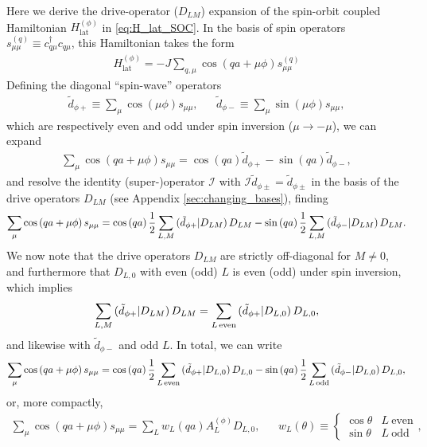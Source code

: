 \documentclass[nofootinbib,notitlepage,11pt]{revtex4-2}
\renewcommand{\t}{\text} %
\newcommand{\f}[2]{\dfrac{#1}{#2}} %
\newcommand{\p}[1]{\left(#1\right)} %
\newcommand{\1}{\mathds{1}}
\newcommand{\I}{\mathcal{I}}
\def\obk#1{\mathinner{({#1})}}
\begin{document}
Here we derive the drive-operator ($D_{LM}$) expansion of the
spin-orbit coupled Hamiltonian $H_{\t{lat}}^{(\phi)}$ in
\eqref{eq:H_lat_SOC}.  In the basis of spin operators
$s_{\mu\mu}^{(q)} \equiv c_{q\mu}^\dag c_{q\mu}$, this Hamiltonian
takes the form
\begin{align}
  H_{\t{lat}}^{(\phi)}
  = -J \sum_{q,\mu} \cos\p{qa+\mu\phi} s_{\mu\mu}^{(q)}
  \label{eq:H_lat_spin}
\end{align}
Defining the diagonal ``spin-wave'' operators
\begin{align}
  \tilde d_{\phi+} \equiv \sum_\mu \cos\p{\mu\phi} s_{\mu\mu},
  &&
  \tilde d_{\phi-} \equiv \sum_\mu \sin\p{\mu\phi} s_{\mu\mu},
\end{align}
which are respectively even and odd under spin inversion
($\mu\to-\mu$), we can expand
\begin{align}
  \sum_\mu \cos\p{qa+\mu\phi} s_{\mu\mu}
  = \cos\p{qa} \tilde d_{\phi+} - \sin\p{qa} \tilde d_{\phi-},
\end{align}
and resolve the identity (super-)operator $\I$ with
$\I \tilde d_{\phi\pm} = \tilde d_{\phi\pm}$ in the basis of the drive operators
$D_{LM}$ (see Appendix \ref{sec:changing_bases}), finding
\begin{align}
  \sum_\mu \cos\p{qa+\mu\phi} s_{\mu\mu}
  = \cos\p{qa} \f12 \sum_{L,M} \obk{\tilde d_{\phi+}|D_{LM}} D_{LM}
  - \sin\p{qa} \f12 \sum_{L,M} \obk{\tilde d_{\phi-}|D_{LM}} D_{LM}.
\end{align}
We now note that the drive operators $D_{LM}$ are strictly
off-diagonal for $M\ne0$, and furthermore that $D_{L,0}$ with even
(odd) $L$ is even (odd) under spin inversion, which implies
\begin{align}
  \sum_{L,M} \obk{\tilde d_{\phi+}|D_{LM}} D_{LM}
  = \sum_{L\,\t{even}} \obk{\tilde d_{\phi+}|D_{L,0}} D_{L,0},
\end{align}
and likewise with $\tilde d_{\phi-}$ and odd $L$.  In total, we can
write
\begin{align}
  \sum_\mu \cos\p{qa+\mu\phi} s_{\mu\mu}
  = \cos\p{qa} \f12 \sum_{L\,\t{even}}
  \obk{\tilde d_{\phi+}|D_{L,0}} D_{L,0}
  - \sin\p{qa} \f12 \sum_{L\,\t{odd}}
  \obk{\tilde d_{\phi-}|D_{L,0}} D_{L,0},
\end{align}
or, more compactly,
\begin{align}
  \sum_\mu \cos\p{qa+\mu\phi} s_{\mu\mu}
  = \sum_L w_L\p{qa} A_L^{(\phi)} D_{L,0},
  &&
  w_L\p{\theta} \equiv
  \begin{cases}
    \cos\theta & L~\t{even} \\
    \sin\theta & L~\t{odd}
  \end{cases},
  \label{eq:compact_SOC_drive}
\end{align}
\end{document}
